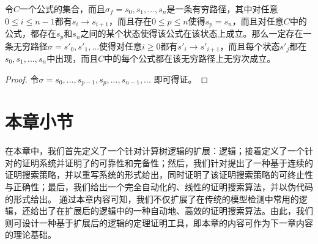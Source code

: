 \begin{proposition}\label{prop:fair_fi}
	令$C$一个\CTLP{}公式的集合，而且$\sigma_f = s_0,s_1,...,s_n$是一条有穷路径，其中对任意$0\le i\le n-1$都有$s_i\rightarrow s_{i+1}$，而且存在$0\le p\le n$使得$s_p = s_n$，而且对任意$C$中的公式，都存在$s_p$和$s_n$之间的某个状态使得该公式在该状态上成立。那么一定存在一条无穷路径$\sigma = s'_0, s'_1,...$使得对任意$i\ge 0$都有$s'_i \rightarrow s'_{i+1}$，而且每个状态$s'_j$都在$s_0,s_1,...,s_n$中出现，而且$C$中的每个公式都在该无穷路径上无穷次成立。
\end{proposition}
\begin{proof}
	令$\sigma = s_0,...,s_{p-1},s_p,...,s_{n-1},...$ 
	即可得证。
\end{proof}

\section{本章小节}
在本章中，我们首先定义了一个针对计算树逻辑\CTL{}的扩展：\CTLP{}逻辑；接着定义了一个针对\CTLP{}的证明系统\SCTL{}并证明了\SCTL{}的可靠性和完备性；然后，我们针对\SCTL{}提出了一种基于连续的证明搜索策略，并以重写系统的形式给出，同时证明了该证明搜索策略的可终止性与正确性；最后，我们给出一个完全自动化的、线性的证明搜索算法，并以伪代码的形式给出。
通过本章内容可知，我们不仅扩展了在传统的模型检测中常用的\CTL{}逻辑，还给出了在扩展后的逻辑中的一种自动地、高效的证明搜索算法。由此，我们则可设计一种基于扩展后的逻辑的定理证明工具，即本章的内容可作为下一章内容的理论基础。




